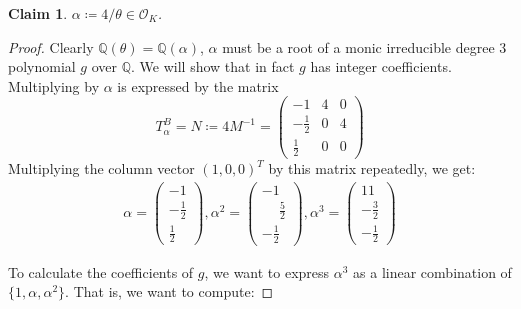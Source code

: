 \documentclass[11pt]{article}
\newtheorem{claim}[theorem]{Claim}
\theoremstyle{definition}
\begin{document}
    \begin{claim}
        $\alpha \coloneqq 4/\theta \in \mathcal{O}_K$.
    \end{claim}
    \begin{proof}

        Clearly $\mathbb{Q}(\theta) = \mathbb{Q}(\alpha)$, $\alpha$ must be a root of a monic irreducible degree $3$ polynomial $g$ over $\mathbb{Q}$.
        We will show that in fact $g$ has integer coefficients.
        Multiplying by $\alpha$ is expressed by the matrix
        \[T_{\alpha}^{B} = N \coloneqq 4M^{-1} =
            \begin{pmatrix}
                -1 & 4 & 0 \\
                -\frac{1}{2} & 0 & 4 \\
                \frac{1}{2} &  0 & 0
            \end{pmatrix}
        \]
        Multiplying the column vector $(1, 0, 0)^T$ by this matrix repeatedly,
        we get:
        \begin{align}
            \alpha = \begin{pmatrix}
                -1 \\
                -\frac{1}{2} \\
                \frac{1}{2}
            \end{pmatrix},
            \alpha^2 = \begin{pmatrix}
                -1 \\
                \phantom{-}\frac{5}{2} \\
                -\frac{1}{2}
            \end{pmatrix},
            \alpha^3 = \begin{pmatrix}
                11 \\
                -\frac{3}{2} \\
                -\frac{1}{2}
            \end{pmatrix}
        \end{align}

        To calculate the coefficients of $g$, we want to express $\alpha^3$ as a linear combination of $\{1, \alpha, \alpha^2\}$.
        That is, we want to compute:


\end{proof}
\end{document}
